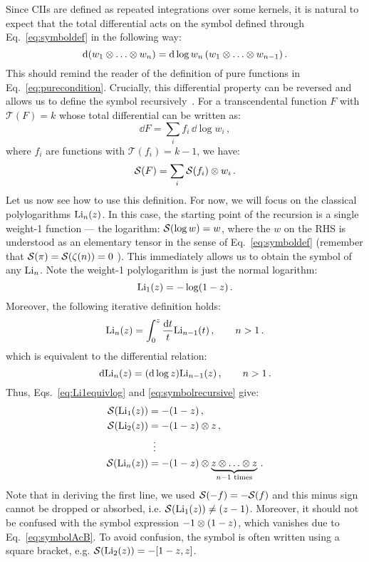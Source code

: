 \documentclass[main.tex]{subfiles}
\begin{document}
Since CIIs are defined as repeated integrations over some kernels, it is natural to expect that the total differential acts on the symbol defined through Eq.~\ref{eq:symboldef} in the following way:
\begin{equation} \label{eq:symboldiff}
    \mathrm{d} (w_1 \otimes \ldots \otimes w_n) = \mathrm{d} \log w_n \, (w_1 \otimes \ldots \otimes w_{n-1})\,.
\end{equation}
This should remind the reader of the definition of pure functions in Eq.~\ref{eq:purecondition}. Crucially, this differential property can be reversed and allows us to define the symbol recursively~\cite{Goncharov:2010jf}. For a transcendental function $F$ with $\mathcal{T}(F) = k$ whose total differential can be written as:
\begin{equation}
    \dd F = \sum_i f_i \, \dd \log w_i\,,
\end{equation}
where $f_i$ are functions with $\mathcal{T}(f_i)=k-1$, we have:
\begin{equation} \label{eq:symbolrecursive}
    \mathcal{S}(F) = \sum_i \mathcal{S}(f_i)\otimes w_i \,.
\end{equation}
Let us now see how to use this definition. For now, we will focus on the classical polylogarithms $\text{Li}_n(z)$. In this case, the starting point of the recursion is a single weight-1 function --- the logarithm: $\mathcal{S}(\log w) = w$, where the $w$ on the RHS is understood as an elementary tensor in the sense of Eq.~\ref{eq:symboldef} (remember that $\mathcal{S}(\pi) = \mathcal{S}(\zeta(n))=0$ ). This immediately allows us to obtain the symbol of any $\text{Li}_n$. Note the weight-1 polylogarithm is just the normal logarithm:
\begin{equation} \label{eq:Li1equivlog}
    \text{Li}_1(z) = -\log (1-z)\,. 
\end{equation}
Moreover, the following iterative definition holds:
\begin{equation} \label{eq:Liiterative}
    \text{Li}_n(z) = \int_0^z \frac{\mathrm{d} t}{t} \text{Li}_{n-1}(t)\,, \qquad n>1\,.
\end{equation}
which is equivalent to the differential relation:
\begin{equation}
    \mathrm{d} \text{Li}_n(z) = (\mathrm{d} \log z) \text{Li}_{n-1}(z)\,, \qquad n>1\,.
\end{equation}
Thus, Eqs.~\ref{eq:Li1equivlog} and \ref{eq:symbolrecursive} give:
\begin{align} \label{eq:Lisymbols}
    \mathcal{S}(\text{Li}_1(z)) &= -(1-z)\,, \nonumber \\
    \mathcal{S}(\text{Li}_2(z)) &= -(1-z) \otimes z \,, \nonumber \\
    &\,\,\, \vdots \nonumber \\
    \mathcal{S}(\text{Li}_n(z)) &= -(1-z) \otimes \underbrace{z \otimes \ldots \otimes z}_{n-1 \text{ times}}\,.
\end{align}
Note that in deriving the first line, we used $\mathcal{S}(-f) = -\mathcal{S}(f)$ and this minus sign cannot be dropped or absorbed, i.e. $\mathcal{S}(\text{Li}_1(z)) \neq (z-1)$. Moreover, it should not be confused with the symbol expression $-1 \otimes (1-z)$, which vanishes due to Eq.~\ref{eq:symbolAcB}. To avoid confusion, the symbol is often written using a square bracket, e.g. $\mathcal{S}(\text{Li}_2(z)) = -[1-z, z]$.
\end{document}
